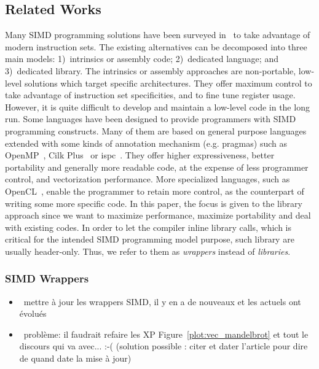 \subsection{Related Works}

Many SIMD programming solutions have been surveyed in~\cite{Pohl2016} to take
advantage of modern instruction sets. The existing alternatives can be
decomposed into three main models: 1)~intrinsics or assembly code; 2)~dedicated
language; and 3)~dedicated library. The intrinsics or assembly approaches are
non-portable, low-level solutions which target specific architectures. They
offer maximum control to take advantage of instruction set specificities, and to
fine tune register usage. However, it is quite difficult to develop and maintain
a low-level code in the long run. Some languages have been designed to provide
programmers with SIMD programming constructs. Many of them are based on general
purpose languages extended with some kinds of annotation mechanism (e.g.
pragmas) such as OpenMP~\cite{OpenMP2013}, Cilk Plus~\cite{Robison2013} or
ispc~\cite{Pharr2012}. They offer higher expressiveness, better portability and
generally more readable code, at the expense of less programmer control, and
vectorization performance. More specialized languages, such as
OpenCL~\cite{Howes2015}, enable the programmer to retain more control, as the
counterpart of writing some more specific code.
In this paper, the focus is given to the library approach since we want to
maximize performance, maximize portability and deal with existing \Cxx codes. In
order to let the compiler inline library calls, which is critical for the
intended SIMD programming model purpose, such library are usually header-only.
Thus, we refer to them as \textit{wrappers} instead of \textit{libraries}.

\subsubsection{\Cxx SIMD Wrappers}

\begin{itemize}
  \item \xmark~mettre à jour les wrappers SIMD, il y en a de nouveaux et les
    actuels ont évolués
  \item \xmark~problème: il faudrait refaire les XP
    Figure~\ref{plot:vec_mandelbrot} et tout le discours qui va avec... :-(
    (solution possible : citer et dater l'article pour dire de quand date la
    mise à jour)
\end{itemize}

